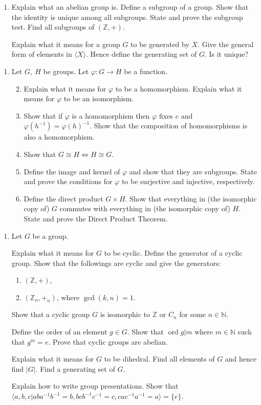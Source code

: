 \documentclass{article}
\newlength{\qspace}
\newcounter{qnumber}
\newenvironment{question}%
 {\vspace{\qspace}
  \begin{enumerate}[\bfseries 1\quad][10]%
    \setcounter{enumi}{\value{qnumber}}%
    \item%
 }
{
  \end{enumerate}
  \filbreak
  \stepcounter{qnumber}
 }
\newenvironment{questionparts}[1][1]%
 {
  \begin{enumerate}[\bfseries (i)]%
    \setcounter{enumii}{#1}
    \addtocounter{enumii}{-1}
    \setlength{\parskip}{3pt}
 }
 {
  \end{enumerate}
 }
\begin{document}
\begin{question}
Explain what an abelian group is. Define a subgroup of a group. Show that the identity is unique among all subgroups. State and prove the subgroup test.
Find all subgroups of $ (\mathbb{Z} ,+) $.

Explain what it means for a group $G$ to be generated by $X$. Give the general form of elements in $ \langle X \rangle  $. Hence define the generating set of $G$. Is it unique?
\end{question}

\begin{question}
  Let $ G,\ H $ be groups. Let $ \varphi: G\to H $ be a function.

  \begin{questionparts}
    \item Explain what it means for $ \varphi $ to be a homomorphism. Explain what it means for $ \varphi $ to be an isomorphism.
    \item Show that if $ \varphi $ is a homomorphism then $ \varphi $ fixes $e$ and $ \varphi (h^{-1})=\varphi (h)^{-1} $. Show that the composition of homomorphisms is also a homomorphism.
    \item Show that $ G \cong H \Leftrightarrow H \cong G $.
    \item Define the image and kernel of $ \varphi $ and show that they are subgroups. State and prove the conditions for $ \varphi $ to be surjective and injective, respectively.
    \item Define the direct product $ G \times H $. Show that everything in (the isomorphic copy of) $G$ commutes with everything in (the isomorphic copy of) $H$. State and prove the Direct Product Theorem.
  \end{questionparts}
\end{question}
\newpage
\begin{question}
  Let $G$ be a group. 
  
  Explain what it means for $G$ to be cyclic. Define the generator of a cyclic group. Show that the followings are cyclic and give the generators:
    \begin{enumerate}
      \item $ (\mathbb{Z} ,+) $,
      \item $ (\mathbb{Z}_n, +_n) $, where $ \gcd(k,n)=1 $.
    \end{enumerate}
  
  Show that a cyclic group $G$ is isomorphic to $ \mathbb{Z}  $ or $ C_n $ for some $ n\in \mathbb{N} $.

  Define the order of an element $ g\in G $. Show that $ \operatorname{ord} g |m$ where $ m\in \mathbb{N} $ such that $ g^m=e $. Prove that cyclic groups are abelian.

  Explain what it means for $G$ to be dihedral. Find all elements of $G$ and hence find $ |G| $. Find a generating set of $G$.

  Explain how to write group presentations. Show that $ \langle a,b,c| aba^{-1}b^{-1}=b, bcb^{-1}c^{-1}=c, cac^{-1}a^{-1}=a \rangle=\{e\} $.
\end{question}
\end{document}
